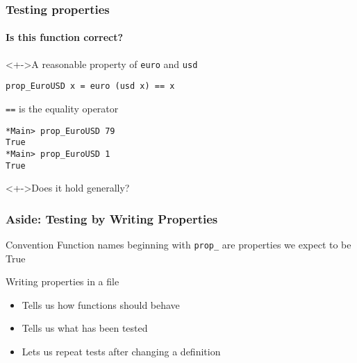 \documentclass{beamer}
\begin{document}
\begin{frame}[fragile]
  \frametitle{Testing properties}
  \framesubtitle{Is this function correct?}
  \begin{block}<+->{A reasonable property of \texttt{euro} and \texttt{usd}}
\begin{verbatim}
prop_EuroUSD x = euro (usd x) == x
\end{verbatim}
    \texttt{==} is the equality operator
\begin{verbatim}
*Main> prop_EuroUSD 79
True
*Main> prop_EuroUSD 1
True
\end{verbatim}
  \end{block}
  \begin{alertblock}<+->{Does it hold generally?}
    
  \end{alertblock}
\end{frame}
\begin{frame}[fragile]
  \frametitle{Aside: Testing by Writing Properties}
  \begin{block}{Convention}
    Function names beginning with
    \verb|prop_| are properties we expect to be True 
  \end{block}
  \begin{block}{Writing properties in a file}
    \begin{itemize}
    \item Tells us how functions should behave 
    \item Tells us what has been tested 
    \item Lets us repeat tests after changing a definition 
    \end{itemize}
  \end{block}
\end{frame}
\end{document}
